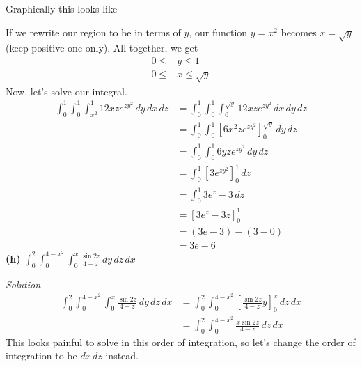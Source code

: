 \documentclass{article}
\newcommand{\lrp}[1]{\left( #1 \right)}
\newcommand{\lrb}[1]{\left[ #1 \right]}
\newcommand{\Solution}{\textit{Solution}}
\begin{document}
Graphically this looks like
\begin{center}
\end{center}
If we rewrite our region to be in terms of $y$, our function $y=x^2$ becomes $x=\sqrt{y}$ (keep positive one only). All together, we get
\begin{align*}
    0\leq &y\leq 1\\
    0\leq &x\leq \sqrt{y}
\end{align*}
Now, let's solve our integral.
\begin{align*}
    \int_0^1 \int_0^1 \int_{x^2} ^1 12 xze^{zy^2}\,dy\,dx\,dz&=\int_0^1 \int_0^1\int_0^{\sqrt{y}}12xze^{zy^2}\,dx\,dy\,dz\\
    &=\int_0^1\int_0^1\lrb{6x^2 ze^{zy^2}}_0^{\sqrt{y}}\,dy\,dz\\
    &=\int_0^1\int_0^1 6yze^{zy^2}\,dy\,dz\\
    &=\int_0^1\lrb{3e^{zy^2}}_0^1\,dz\tag{you could also do a u-sub $u=y^2$}\\
    &=\int_0^1 3e^{z}- 3\,dz\\
    &=\lrb{3e^z-3z}_0^1\\
    &=\lrp{3e-3}-\lrp{3-0}\\
    &=\boxed{3e-6}
\end{align*}
\textbf{(h)} $\displaystyle \int_0^2\int_0^{4-x^2}\int_0^x \frac{\sin 2z}{4-z}\,dy\,dz\,dx$

\Solution
\begin{align*}
    \int_0^2\int_0^{4-x^2}\int_0^x \frac{\sin 2z}{4-z}\,dy\,dz\,dx&=\int_0^2 \int_0^{4-x^2}\lrb{\frac{\sin 2z}{4-z}y}_0^x\,dz\,dx\\
    &=\int_0^2\int_0^{4-x^2}\frac{x\sin 2z}{4-z}\,dz\,dx
\end{align*}
This looks painful to solve in this order of integration, so let's change the order of integration to be $dx\,dz$ instead.
\end{document}
